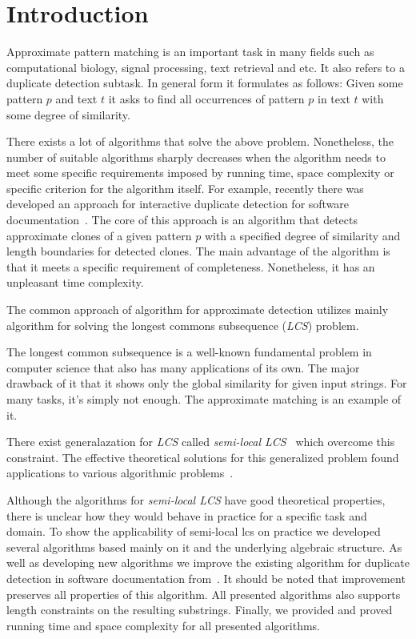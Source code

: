 \section{Introduction}
Approximate pattern matching is an important task in many fields such as computational biology, signal processing, text retrieval and etc.
It also refers to a duplicate detection subtask.
In general form it formulates as follows: Given some pattern $p$ and text $t$ it asks to find all occurrences of pattern $p$ in text $t$ with some degree of similarity.

There exists a lot of algorithms that solve the above problem.
Nonetheless, the number of suitable algorithms sharply decreases when the algorithm needs to meet some specific requirements imposed by running time, space complexity or specific criterion for the algorithm itself.
For example, recently there was developed an approach for interactive duplicate detection for software documentation~\cite{luciv2019interactive}.
The core of this approach is an algorithm that detects approximate clones of a given pattern $p$ with a specified degree of similarity and length boundaries for detected clones.
The main advantage of the algorithm is that it meets a specific requirement of completeness.
Nonetheless, it has an unpleasant time complexity.



   
The common approach of algorithm for approximate detection utilizes mainly algorithm for solving the longest commons subsequence (\emph{LCS}) problem.

The longest common subsequence is a well-known fundamental problem in computer science that also has many applications of its own.
The major drawback of it that it shows only the global similarity for given input strings.
For many tasks, it's simply not enough.
The approximate matching is an example of it.

There exist generalazation for \emph{LCS} called \emph{semi-local LCS}~\cite{tiskin2008semi} which overcome this constraint. 
The effective theoretical solutions for this generalized problem found applications to various algorithmic problems~\cite{tiskin2009periodic,tiskin2006longest,tiskin2011towards}.

Although the algorithms for \emph{semi-local LCS} have good theoretical properties, there is unclear how they would behave in practice for a specific task and domain.
To show the applicability of semi-local lcs on practice we developed several algorithms based mainly on it and the underlying algebraic structure.
As well as developing new algorithms we improve the existing algorithm for duplicate detection in software documentation from~\cite{luciv2019interactive}.
It should be noted that improvement preserves all properties of this algorithm.
All presented algorithms also supports length constraints on the resulting substrings.
Finally, we provided and proved running time and space complexity for all presented algorithms.


